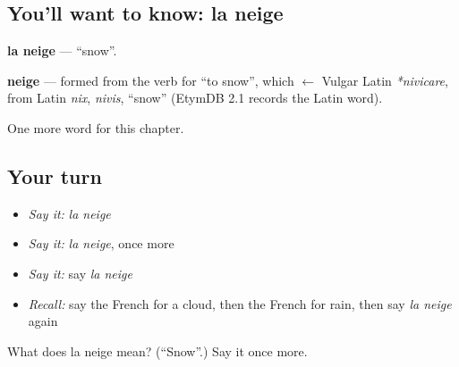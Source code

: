 \subsection*{You'll want to know: la neige}
\textbf{la neige} — \textquotedblleft{}snow\textquotedblright{}.

\begin{cousinweb}
\textbf{neige} — formed from the verb for \textquotedblleft{}to snow\textquotedblright{}, which $\leftarrow$ Vulgar Latin \emph{*nivicare}, from Latin \emph{nix}, \emph{nivis}, \textquotedblleft{}snow\textquotedblright{} (EtymDB 2.1 records the Latin word).
\end{cousinweb}

\begin{grammarlens}[title={What you've built}]
One more word for this chapter.
\end{grammarlens}

\subsection*{Your turn}
\begin{itemize}
\raggedright
  \item \emph{Say it:} \emph{la neige}
  \item \emph{Say it:} \emph{la neige}, once more
  \item \emph{Say it:} say \emph{la neige}
  \item \emph{Recall:} say the French for a cloud, then the French for rain, then say \emph{la neige} again
\end{itemize}

\begin{tcolorbox}[breakable,colback=teal!4,colframe=teal!35!black,title={Before you move on}]
What does la neige mean? (\textquotedblleft{}Snow\textquotedblright{}.) Say it once more.
\end{tcolorbox}
